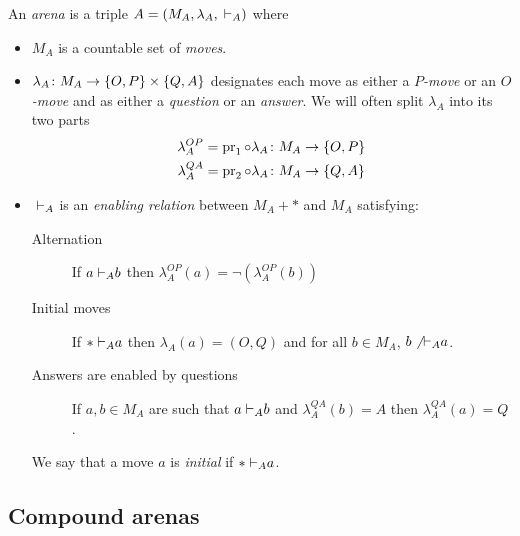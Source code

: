 \documentclass{article}
\begin{document}
\begin{definition}
  An \emph{arena} is a triple $A=(M_A,\lambda_A,{\;\vdash}_A)$ where
  \begin{itemize}
    \item $M_A$ is a countable set of \emph{moves}.
    \item $\lambda_A\colon M_A\to\{O,P\}\times\{Q,A\}$ designates each move as either a \emph{$P$-move} or an \emph{$O$-move} and as either a \emph{question} or an \emph{answer}.  
      We will often split $\lambda_A$ into its two parts
      \begin{gather}
        \lambda_A^{OP} = \operatorname{pr}_1\circ\lambda_A\colon M_A\to\{O,P\}\\
        \lambda_A^{QA} = \operatorname{pr}_2\circ\lambda_A\colon M_A\to\{Q,A\}
      \end{gather}
    \item ${\;\vdash}_A$ is an \emph{enabling relation} between $M_A+*$ and $M_A$ satisfying:
      \begin{description}
        \item[Alternation] If $a {\;\vdash}_A b$ then $\lambda_A^{OP} (a) = \neg(\lambda_A^{OP}(b))$
        \item[Initial moves] If $*{\;\vdash}_A a$ then $\lambda_A(a) = (O,Q)$ and for all $b\in M_A$, $b\not{{\;\vdash}_A} a$.
        \item[Answers are enabled by questions] If $a,b\in M_A$ are such that $a {\;\vdash}_A b$ and $\lambda_A^{QA}(b)=A$ then $\lambda_A^{QA}(a)=Q$.
      \end{description}
      We say that a move $a$ is \emph{initial} if $*{\;\vdash}_A a$.
  \end{itemize}
\end{definition}

\subsection{Compound arenas}
\end{document}
